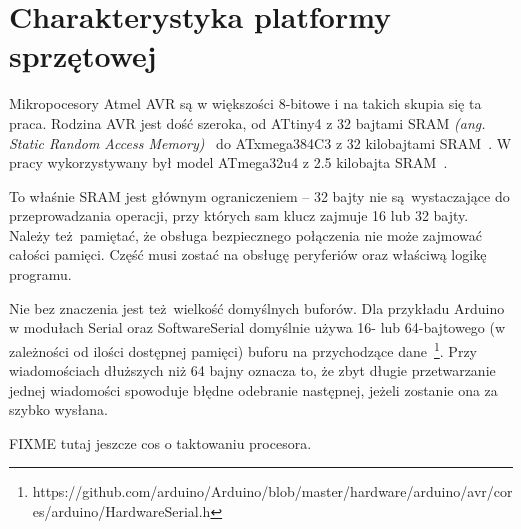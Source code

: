 \chapter{Charakterystyka platformy sprzętowej}
\label{cha:hardware}

Mikropocesory Atmel AVR są w większości 8-bitowe i na takich skupia się ta praca. Rodzina AVR jest dość szeroka, od ATtiny4 z 32 bajtami SRAM \emph{(ang. Static Random Access Memory)}~\cite{Attiny4} do ATxmega384C3 z 32 kilobajtami SRAM~\cite{Atxmega384}. W pracy wykorzystywany był model ATmega32u4 z 2.5 kilobajta SRAM~\cite{Atmega32}.

To właśnie SRAM jest głównym ograniczeniem -- 32 bajty nie są wystaczające do przeprowadzania operacji, przy których sam klucz zajmuje 16 lub 32 bajty. Należy też pamiętać, że obsługa bezpiecznego połączenia nie może zajmować całości pamięci. Część musi zostać na obsługę peryferiów oraz właściwą logikę programu.

Nie bez znaczenia jest też wielkość domyślnych buforów. Dla przykładu Arduino w modułach Serial oraz SoftwareSerial domyślnie używa 16- lub 64-bajtowego (w zależności od ilości dostępnej pamięci) buforu na przychodzące dane~\footnote{https://github.com/arduino/Arduino/blob/master/hardware/arduino/avr/cores/arduino/HardwareSerial.h}. Przy wiadomościach dłuższych niż 64 bajny oznacza to, że zbyt długie przetwarzanie jednej wiadomości spowoduje błędne odebranie następnej, jeżeli zostanie ona za szybko wysłana.

FIXME tutaj jeszcze cos o taktowaniu procesora.
